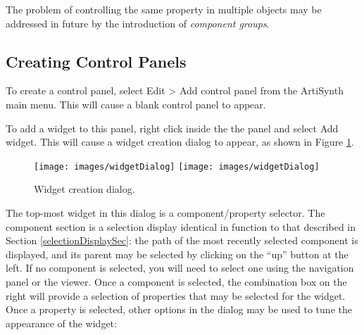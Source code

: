 \documentclass{article}
\begin{document}
\begin{sideblock}
The problem of controlling the same property in multiple objects
may be addressed in future by the introduction of {\it component groups}.
\end{sideblock}

\subsection{Creating Control Panels}

To create a control panel, select {\sf Edit > Add control panel} from the
ArtiSynth main menu. This will cause a blank control panel to appear.

To add a widget to this panel, right click inside the the panel and select
{\sf Add widget}. This will cause a widget creation dialog to appear,
as shown in Figure \ref{widgetCreationDialogFig}.

\begin{figure}
\begin{center}
\iflatexml
\texttt{[image: images/widgetDialog]}
\else
\texttt{[image: images/widgetDialog]}
\fi
\end{center}
\caption{Widget creation dialog.}%
\label{widgetCreationDialogFig}
\end{figure}

The top-most widget in this dialog is a component/property
selector. The component section is a selection display identical in
function to that described in Section \ref{selectionDisplaySec}: the path of the
most recently selected component is displayed, and its parent may be
selected by clicking on the ``up'' button at the left. If no component
is selected, you will need to select one using the navigation panel or
the viewer.  Once a component is selected, the combination box on the
right will provide a selection of properties that may be selected for
the widget. Once a property is selected, other options in the dialog
may be used to tune the appearance of the widget:
\end{document}
